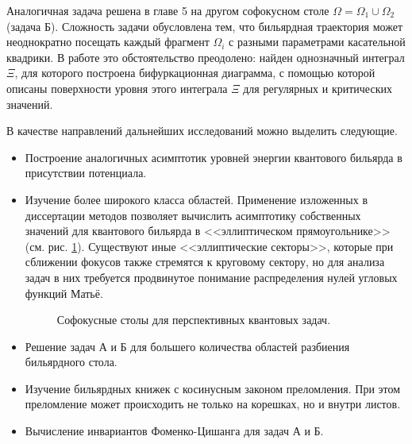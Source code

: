 Аналогичная задача решена в главе 5 на другом софокусном столе $\Omega = \Omega_1 \cup \Omega_2$ (задача Б). 
Сложность задачи обусловлена тем, что бильярдная траектория может неоднократно посещать каждый фрагмент $\Omega_i$ с разными параметрами касательной квадрики. 
В работе это обстоятельство преодолено: найден однозначный интеграл $\Xi$, для которого построена бифуркационная диаграмма, с помощью которой описаны поверхности уровня этого интеграла $\Xi$ для регулярных и критических значений.

В качестве направлений дальнейших исследований можно выделить следующие.
  \begin{itemize}[beginpenalty=10000] %
  \item Построение аналогичных асимптотик уровней энергии квантового бильярда в присутствии потенциала.
  \item Изучение более широкого класса областей. Применение изложенных в диссертации методов позволяет вычислить асимптотику собственных значений для квантового бильярда в <<эллиптическом прямоугольнике>> (см. рис. \ref{fig:conclusion_quantum_domains}). Существуют иные <<эллиптические секторы>>, которые при сближении фокусов также стремятся к круговому сектору, но для анализа задач в них требуется продвинутое понимание распределения нулей  угловых функций Матьё.
    \begin{figure}[ht]
    \caption{Софокусные столы для перспективных квантовых задач.}\label{fig:conclusion_quantum_domains}
\end{figure}  
  \item Решение задач А и Б для большего количества областей разбиения бильярдного стола. 
  \item Изучение бильярдных книжек с косинусным законом преломления. При этом преломление может происходить не только на корешках, но и внутри листов. 
  \item Вычисление инвариантов Фоменко-Цишанга для задач А и Б.
  \end{itemize}

%
